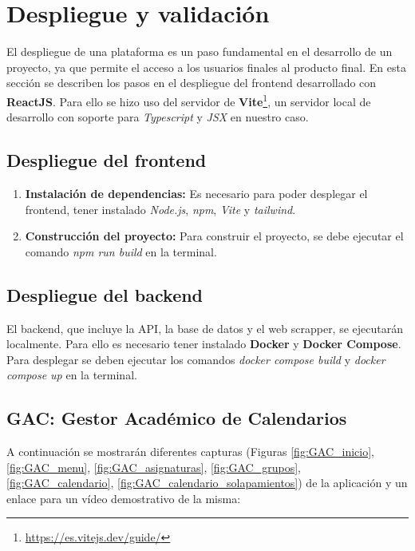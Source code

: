 \chapter{Despliegue y validación}

El despliegue de una plataforma es un paso fundamental en el desarrollo de un proyecto, ya que permite el acceso a los usuarios finales al producto final. En esta sección se describen los pasos en el despliegue del frontend desarrollado con \textbf{ReactJS}. Para ello se hizo uso del servidor de \textbf{Vite}\footnote{\url{https://es.vitejs.dev/guide/}}, un servidor local de desarrollo con soporte para \textit{Typescript} y \textit{JSX} en nuestro caso.

\section{Despliegue del frontend}

\begin{enumerate}
    \item \textbf{Instalación de dependencias:} Es necesario para poder desplegar el frontend, tener instalado \textit{Node.js}, \textit{npm}, \textit{Vite} y \textit{tailwind}.
    \item \textbf{Construcción del proyecto:} Para construir el proyecto, se debe ejecutar el comando \textit{npm run build} en la terminal.
\end{enumerate}

\section{Despliegue del backend}

El backend, que incluye la API, la base de datos y el web scrapper, se ejecutarán localmente. Para ello es necesario tener instalado \textbf{Docker} y \textbf{Docker Compose}. Para desplegar se deben ejecutar los comandos \textit{docker compose build} y \textit{docker compose up} en la terminal.

\section{GAC: Gestor Académico de Calendarios}

A continuación se mostrarán diferentes capturas (Figuras \ref{fig:GAC_inicio}, \ref{fig:GAC_menu}, \ref{fig:GAC_asignaturas}, \ref{fig:GAC_grupos}, \ref{fig:GAC_calendario}, \ref{fig:GAC_calendario_solapamientos}) de la aplicación y un enlace para un vídeo demostrativo de la misma:

